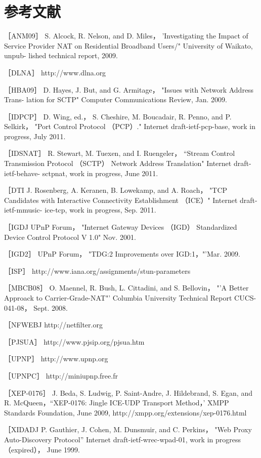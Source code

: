 \section{参考文献}

［ANM09］ S. Alcock, R. Nelson, and D. Miles， 'Investigating the Impact of Service
Provider NAT on Residential Broadband Users/" University of Waikato, unpub-
lished technical report, 2009.

［DLNA］ http://www.dlna.org

［HBA09］ D. Hayes, J. But, and G. Armitage， "Issues with Network Address Trans-
lation for SCTP" Computer Communications Review, Jan. 2009.

［IDPCP］ D. Wing, ed.， S. Cheshire, M. Boucadair, R. Penno, and P. Selkirk， "Port
Control Protocol （PCP）." Internet draft-ietf-pcp-base, work in progress, July 2011.

［IDSNAT］ R. Stewart, M. Tuexen, and I. Ruengeler， “Stream Control Transmission
Protocol （SCTP） Network Address Translation" Internet draft-ietf-behave-
sctpnat, work in progress, June 2011.

［DTI J. Rosenberg, A. Keranen, B. Lowekamp, and A. Roach， "TCP Candidates
with Interactive Connectivity Establishment （ICE）" Internet draft-ietf-mmusic-
ice-tcp, work in progress, Sep. 2011.

［IGDJ UPnP Forum， "Internet Gateway Devices （IGD） Standardized Device
Control Protocol V 1.0" Nov. 2001.

［IGD2］ UPnP Forum， "TDG:2 Improvements over IGD:1，"'Mar. 2009.

［ISP］ http://www.iana.org/assignments/stun-parameters

［MBCB08］ O. Maennel, R. Bush, L. Cittadini, and S. Bellovin， "'A Better Approack
to Carrier-Grade-NAT"' Columbia University Technical Report CUCS-041-08，
Sept. 2008.

［NFWEBJ http://netfilter.org

［PJSUA］ http://www.pjsip.org/pjsua.htm

［UPNP］ http://www.upnp.org

［UPNPC］ http://miniupnp.free.fr

［XEP-0176］ J. Beda, S. Ludwig, P. Saint-Andre, J. Hildebrand, S. Egan, and R.
McQueen，“XEP-0176: Jingle ICE-UDP Transport Method，' XMPP Standards
Foundation, June 2009, http://xmpp.org/extensions/xep-0176.html

［XIDADJ P. Gauthier, J. Cohen, M. Dunsmuir, and C. Perkins， "Web Proxy
Auto-Discovery Protocol” Internet draft-ietf-wrec-wpad-01, work in progress
（expired）， June 1999.

